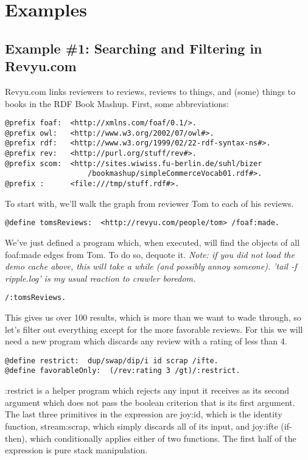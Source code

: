 \documentclass[runningheads]{llncs}
\begin{document}
\section{Examples}

\subsection{Example \#1: Searching and Filtering in Revyu.com}

Revyu.com links reviewers to reviews, reviews to things, and (some) things to
books in the RDF Book Mashup.  First, some abbreviations:

\begin{verbatim}
@prefix foaf:  <http://xmlns.com/foaf/0.1/>.
@prefix owl:   <http://www.w3.org/2002/07/owl#>.
@prefix rdf:   <http://www.w3.org/1999/02/22-rdf-syntax-ns#>.
@prefix rev:   <http://purl.org/stuff/rev#>.
@prefix scom:  <http://sites.wiwiss.fu-berlin.de/suhl/bizer
                   /bookmashup/simpleCommerceVocab01.rdf#>.
@prefix :      <file:///tmp/stuff.rdf#>.
\end{verbatim}


To start with, we'll walk the graph from reviewer Tom to each of his reviews.

\begin{verbatim}
@define tomsReviews:  <http://revyu.com/people/tom> /foaf:made.
\end{verbatim}

We've just defined a program which, when executed, will find the objects of all
foaf:made edges from Tom.  To do so, dequote it.
{\it Note: if you did not load the demo cache above, this will take a while (and possibly annoy someone).  'tail -f ripple.log' is my usual reaction to crawler boredom.}

\begin{verbatim}
/:tomsReviews.
\end{verbatim}

This gives us over 100 results, which is more than we want to wade through, so let's filter out everything except for the more favorable reviews.  For this we will need a new program which discards any review with a rating of less than 4.

\begin{verbatim}
@define restrict:  dup/swap/dip/i id scrap /ifte.
@define favorableOnly:  (/rev:rating 3 /gt)/:restrict.
\end{verbatim}

:restrict is a helper program which rejects any input it receives as its second argument which does not pass the boolean criterion that is its first argument.  The last three primitives in the expression are joy:id, which is the identity function, stream:scrap, which simply discards all of its input, and joy:ifte (if-then), which conditionally applies either of two functions.  The first half of the expression is pure stack manipulation.
\end{document}

